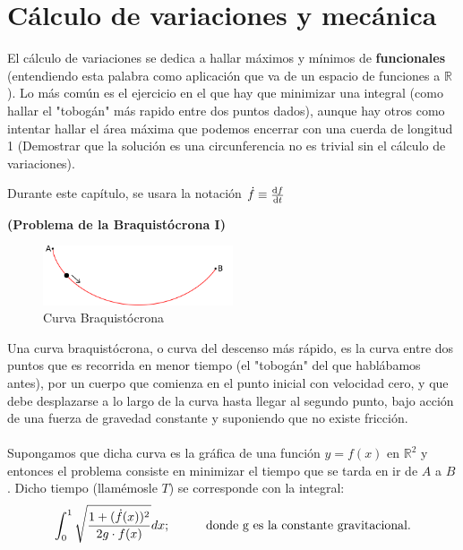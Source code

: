 \documentclass[palatino, bibnumbers]{apuntes}
\begin{document}
\section{Cálculo de variaciones y mecánica}
El cálculo de variaciones se dedica a hallar máximos y mínimos de \textbf{funcionales} (entendiendo esta palabra como aplicación que va de un espacio de funciones a $ℝ$). Lo más común es el ejercicio en el que hay que minimizar una integral (como hallar el "tobogán" más rapido entre dos puntos dados), aunque hay otros como intentar hallar el área máxima que podemos encerrar con una cuerda de longitud 1 (Demostrar que la solución es una circunferencia no es trivial sin el cálculo de variaciones). 
\begin{obs}Durante este capítulo, se usara la notación $\dot{f}\equiv\dv{f}{t}$
\end{obs}
\begin{example}\textbf{(Problema de la Braquistócrona I)}\\
\begin{figure}
		\begin{center}
			\includegraphics[width=0.5\textwidth]{img/GT17_Brachistochrone}
		\end{center}
		\caption{Curva Braquistócrona}
\end{figure}
Una curva braquistócrona, o curva del descenso más rápido, es la curva entre dos puntos que es recorrida en menor tiempo (el "tobogán" del que hablábamos antes), por un cuerpo que comienza en el punto inicial con velocidad cero, y que debe desplazarse a lo largo de la curva hasta llegar al segundo punto, bajo acción de una fuerza de gravedad constante y suponiendo que no existe fricción.\\ \\ \indent Supongamos que dicha curva es la gráfica de una función $y=f(x)$ en $ℝ^2$ y entonces el problema consiste en minimizar el tiempo que se tarda en ir de $A$ a $B$. Dicho tiempo (llamémosle $T$) se corresponde con la integral: $$\int_{0}^{1}\sqrt{\frac{1+(\dot{f}(x))^2}{2g\cdot f(x)}}dx;\hspace*{1cm}\text{donde g es la constante gravitacional.}$$ 
\end{example}
\end{document}
